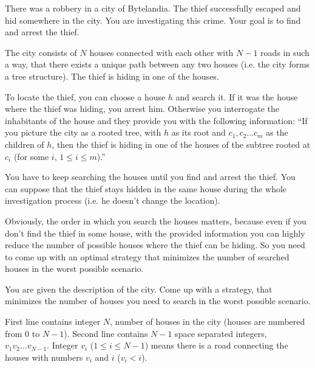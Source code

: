 





There was a robbery in a city of Bytelandia.
The thief successfully escaped and hid somewhere in the city.
You are investigating this crime. Your goal is to find and arrest the thief.

The city consists of $N$ houses connected with each other with $N-1$ roads in
such a way, that there exists a unique path between any two houses (i.e. the city forms a tree structure).
The thief is hiding in one of the houses.

To locate the thief, you can choose a house $h$ and search it.
If it was the house where the thief was hiding, you arrest him.
Otherwise you interrogate the inhabitants of the house and they provide you with the following information:
``If you picture the city as a rooted tree, with $h$ as its root and $c_1, c_2 \ldots c_m$ as the children of $h$,
then the thief is hiding in one of the houses of the subtree rooted at $c_i$ (for some $i$, $1 \leq i \leq m$).''

You have to keep searching the houses until you find and arrest the thief.
You can suppose that the thief stays hidden in the same house during the whole investigation process (i.e. he doesn't change the location).

Obviously, the order in which you search the houses matters, because even if you don't
find the thief in some house, with the provided information you can highly reduce
the number of possible houses where the thief can be hiding.
So you need to come up with an optimal strategy that
minimizes the number of searched houses in the worst possible scenario.


You are given the description of the city.
Come up with a strategy, that minimizes the number
of houses you need to search in the worst possible scenario.


First line contains integer $N$, number of houses in the city (houses are numbered from $0$ to $N-1$).
Second line contains $N-1$ space separated integers, $v_1 v_2 \ldots v_{N-1}$.
Integer $v_i$ ($1 \leq i \leq N-1$) means there is a road connecting the houses with numbers $v_i$ and $i$ ($v_i < i$).

